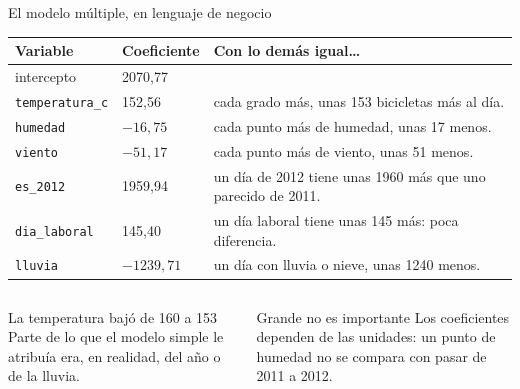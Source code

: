 \documentclass[aspectratio=169,11pt]{beamer}
\begin{document}
\begin{frame}[t]{El modelo múltiple, en lenguaje de negocio}
  \footnotesize
  \renewcommand{\arraystretch}{1.12}
  \begin{tabular}{@{}L{2.6cm}R{1.6cm}L{8.9cm}@{}}
    \toprule
    \textbf{Variable} & \textbf{Coeficiente} & \textbf{Con lo demás igual\ldots} \\
    \midrule
    intercepto & 2070,77 & \\
    \texttt{temperatura\_c} & 152,56 & cada grado más, unas 153 bicicletas más al día. \\
    \texttt{humedad} & $-16{,}75$ & cada punto más de humedad, unas 17 menos. \\
    \texttt{viento} & $-51{,}17$ & cada punto más de viento, unas 51 menos. \\
    \texttt{es\_2012} & 1959,94 & un día de 2012 tiene unas 1960 más que uno parecido de 2011. \\
    \texttt{dia\_laboral} & 145,40 & un día laboral tiene unas 145 más: poca diferencia. \\
    \texttt{lluvia} & $-1239{,}71$ & un día con lluvia o nieve, unas 1240 menos. \\
    \bottomrule
  \end{tabular}
  \vspace{0.12cm}
  \begin{columns}[T,onlytextwidth]
    \begin{block}{La temperatura bajó de 160 a 153}
      \footnotesize Parte de lo que el modelo simple le atribuía era, en
      realidad, del año o de la lluvia.
    \end{block}
    \begin{alertblock}{Grande no es importante}
      \footnotesize Los coeficientes dependen de las unidades: un punto de
      humedad no se compara con pasar de 2011 a 2012.
    \end{alertblock}
  \end{columns}
\end{frame}
\end{document}
